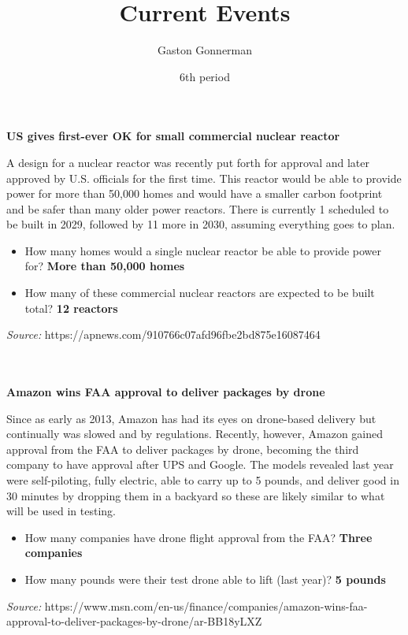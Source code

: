 \documentclass{article}
\title{Current Events}
\author{Gaston Gonnerman}
\date{6th period}
\begin{document}
	\maketitle
	
	\begin{center}
		\large{
			\textbf{US gives first-ever OK for small commercial nuclear reactor}
		}
	\end{center}
	\par A design for a nuclear reactor was recently put forth for approval and later approved by U.S. officials for the first time. This reactor would be able to provide power for more than 50,000 homes and would have a smaller carbon footprint and be safer than many older power reactors. There is currently 1 scheduled to be built in 2029, followed by 11 more in 2030, assuming everything goes to plan.
	
	\begin{itemize}[label=--]
		\item How many homes would a single nuclear reactor be able to provide power for? \textbf{More than 50,000 homes}
		\item How many of these commercial nuclear reactors are expected to be built total? \textbf{12 reactors}
	\end{itemize}

	\noindent
	\emph{Source:} https://apnews.com/910766c07afd96fbe2bd875e16087464
	\\ \\ \\
	
	\begin{center}
		\large{
			\textbf{Amazon wins FAA approval to deliver packages by drone}
		}
	\end{center}
	\par Since as early as 2013, Amazon has had its eyes on drone-based delivery but continually was slowed and by regulations. Recently, however, Amazon gained approval from the FAA to deliver packages by drone, becoming the third company to have approval after UPS and Google. The models revealed last year were self-piloting, fully electric, able to carry up to 5 pounds, and deliver good in 30 minutes by dropping them in a backyard so these are likely similar to what will be used in testing.
	
	\begin{itemize}[label=--]
		\item How many companies have drone flight approval from the FAA? \textbf{Three companies}
		\item How many pounds were their test drone able to lift (last year)? \textbf{5 pounds}
	\end{itemize}

	\noindent
	\emph{Source:} https://www.msn.com/en-us/finance/companies/amazon-wins-faa-approval-to-deliver-packages-by-drone/ar-BB18yLXZ
\end{document}
